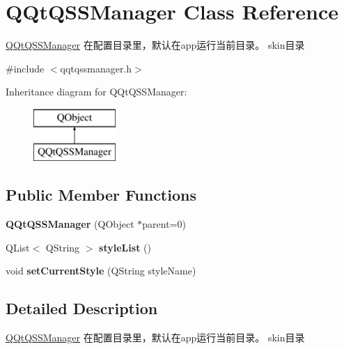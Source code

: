 \hypertarget{class_q_qt_q_s_s_manager}{}\section{Q\+Qt\+Q\+S\+S\+Manager Class Reference}
\label{class_q_qt_q_s_s_manager}


\mbox{\hyperlink{class_q_qt_q_s_s_manager}{Q\+Qt\+Q\+S\+S\+Manager}} 在配置目录里，默认在app运行当前目录。 skin目录  




{\ttfamily \#include $<$qqtqssmanager.\+h$>$}

Inheritance diagram for Q\+Qt\+Q\+S\+S\+Manager\+:\begin{figure}[H]
\begin{center}
\leavevmode
\includegraphics[height=2.000000cm]{class_q_qt_q_s_s_manager}
\end{center}
\end{figure}
\subsection*{Public Member Functions}
\begin{DoxyCompactItemize}
\item 
\mbox{\label{class_q_qt_q_s_s_manager_a15093e1ee36dfc052ad4629006f2ac65}} 
{\bfseries Q\+Qt\+Q\+S\+S\+Manager} (Q\+Object $\ast$parent=0)
\item 
\mbox{\label{class_q_qt_q_s_s_manager_a8f27eea4093199cb8c52972f37afa9f7}} 
Q\+List$<$ Q\+String $>$ {\bfseries style\+List} ()
\item 
\mbox{\label{class_q_qt_q_s_s_manager_ac754c65a7108a1396f6f8f366cc2bf76}} 
void {\bfseries set\+Current\+Style} (Q\+String style\+Name)
\end{DoxyCompactItemize}


\subsection{Detailed Description}
\mbox{\hyperlink{class_q_qt_q_s_s_manager}{Q\+Qt\+Q\+S\+S\+Manager}} 在配置目录里，默认在app运行当前目录。 skin目录 

